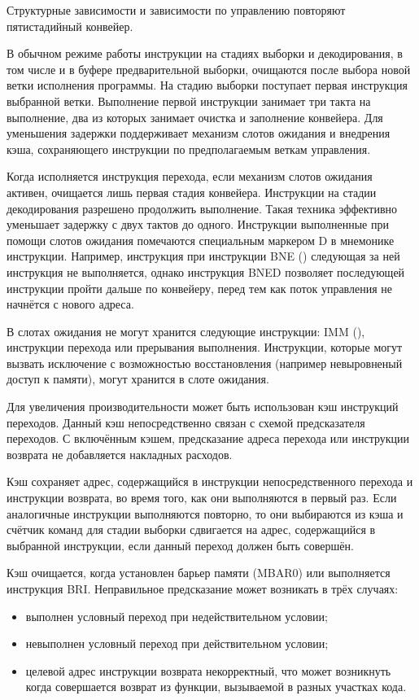 Структурные зависимости и зависимости по управлению повторяют пятистадийный конвейер.

В обычном режиме работы инструкции на стадиях выборки и декодирования, в том числе и
в буфере предварительной выборки, очищаются после выбора новой ветки исполнения программы.
На стадию выборки поступает первая инструкция выбранной ветки. Выполнение первой инструкции
занимает три такта на выполнение, два из которых занимает очистка и заполнение конвейера.
Для уменьшения задержки  поддерживает механизм слотов ожидания и внедрения
кэша, сохраняющего инструкции по предполагаемым веткам управления.

Когда исполняется инструкция перехода, если механизм слотов ожидания активен, очищается
лишь первая стадия конвейера. Инструкции на стадии декодирования разрешено продолжить
выполнение. Такая техника эффективно уменьшает задержку с двух тактов до одного. Инструкции
выполненные при помощи слотов ожидания помечаются специальным маркером D в мнемонике инструкции.
Например, инструкция при инструкции BNE () следующая за ней инструкция не
выполняется, однако инструкция BNED позволяет последующей инструкции пройти дальше по конвейеру, перед
тем как поток управления не начнётся с нового адреса.

В слотах ожидания не могут хранится следующие инструкции: IMM (),
инструкции перехода или прерывания выполнения. Инструкции, которые могут вызвать
исключение с возможностью восстановления (например невыровненый доступ к памяти),
могут хранится в слоте ожидания.

Для увеличения производительности может быть использован кэш инструкций переходов.
Данный кэш непосредственно связан с схемой предсказателя переходов. С включённым кэшем,
предсказание адреса перехода или инструкции возврата не добавляется накладных
расходов.

Кэш сохраняет адрес, содержащийся в инструкции непосредственного перехода и инструкции
возврата, во время того, как они выполняются в первый раз. Если аналогичные инструкции
выполняются повторно, то они выбираются из кэша и счётчик команд для стадии выборки сдвигается
на адрес, содержащийся в выбранной инструкции, если данный переход должен быть совершён.

Кэш очищается, когда установлен барьер памяти (MBAR0) или выполняется инструкция BRI.
Неправильное предсказание может возникать в трёх случаях:
\begin{itemize}
   \item выполнен условный переход при недействительном условии;
   \item невыполнен условный переход при действительном условии;
   \item целевой адрес инструкции возврата некорректный, что
     может возникнуть когда совершается возврат из функции, вызываемой
     в разных участках кода.
\end{itemize}

